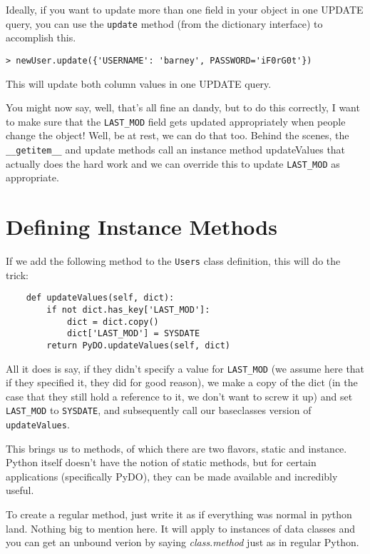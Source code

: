 \documentclass[titlepage]{manual}
\begin{document}
Ideally, if you want to update more than one field in your object in
one UPDATE query, you can use the \texttt{update} method (from the
dictionary interface) to accomplish this.

\begin{verbatim}
> newUser.update({'USERNAME': 'barney', PASSWORD='iF0rG0t'})
\end{verbatim}

This will update both column values in one UPDATE query.

You might now say, well, that's all fine an dandy, but to do this
correctly, I want to make sure that the \texttt{LAST_MOD} field gets
updated appropriately when people change the object!  Well, be at
rest, we can do that too.  Behind the scenes, the \texttt{__getitem__}
and update methods call an instance method updateValues that actually
does the hard work and we can override this to update
\texttt{LAST_MOD} as appropriate.

\section{Defining Instance Methods}

If we add the following method to the \texttt{Users} class definition, this
will do the trick:

\begin{verbatim}
    def updateValues(self, dict):
        if not dict.has_key['LAST_MOD']:
            dict = dict.copy()
            dict['LAST_MOD'] = SYSDATE
        return PyDO.updateValues(self, dict)
\end{verbatim}

All it does is say, if they didn't specify a value for
\texttt{LAST_MOD} (we assume here that if they specified it, they did
for good reason), we make a copy of the dict (in the case that they
still hold a reference to it, we don't want to screw it up) and set
\texttt{LAST_MOD} to \texttt{SYSDATE}, and subsequently call our
baseclasses version of \texttt{updateValues}.

This brings us to methods, of which there are two flavors, static and
instance.  Python itself doesn't have the notion of static methods,
but for certain applications (specifically PyDO), they can be
made available and incredibly useful.

To create a regular method, just write it as if everything was normal
in python land.  Nothing big to mention here.  It will apply to
instances of data classes and you can get an unbound verion by saying
\emph{class}.\emph{method} just as in regular Python.
\end{document}

